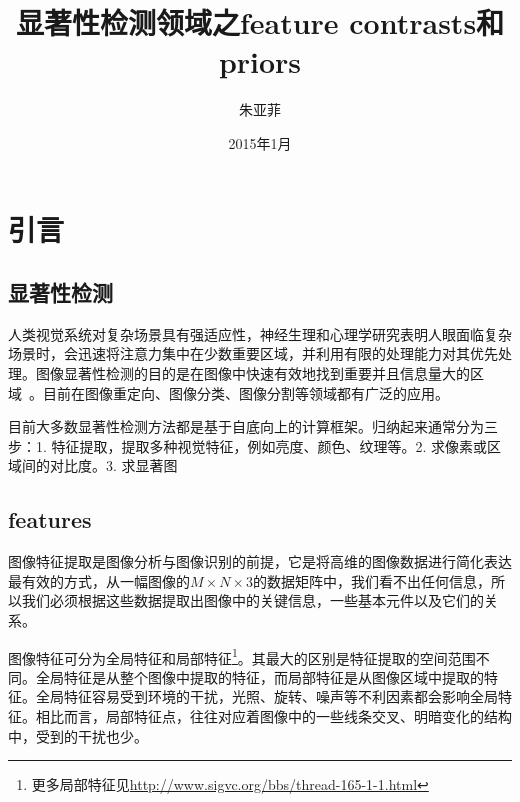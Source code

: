 \documentclass[12pt]{article}
\begin{document}
\title{\vspace{-2em}显著性检测领域之feature contrasts和priors\vspace{-0.7em}}
\author{朱亚菲}
\date{\vspace{-0.7em}2015年1月\vspace{-0.7em}}
\maketitle\thispagestyle{fancy}
\maketitle
\tableofcontents 


\section{引言}

\subsection{显著性检测}

人类视觉系统对复杂场景具有强适应性，神经生理和心理学研究表明人眼面临复杂场景时，会迅速将注意力集中在少数重要区域，并利用有限的处理能力对其优先处理。图像显著性检测的目的是在图像中快速有效地找到重要并且信息量大的区域~\cite{li2013contextual}。目前在图像重定向、图像分类、图像分割等领域都有广泛的应用。

目前大多数显著性检测方法都是基于自底向上的计算框架。归纳起来通常分为三步：1. 特征提取，提取多种视觉特征，例如亮度、颜色、纹理等。2. 求像素或区域间的对比度。3. 求显著图

\subsection{features}

图像特征提取是图像分析与图像识别的前提，它是将高维的图像数据进行简化表达最有效的方式，从一幅图像的$M \times N \times3$的数据矩阵中，我们看不出任何信息，所以我们必须根据这些数据提取出图像中的关键信息，一些基本元件以及它们的关系。

图像特征可分为全局特征和局部特征\footnote{更多局部特征见\url{http://www.sigvc.org/bbs/thread-165-1-1.html}}。其最大的区别是特征提取的空间范围不同。全局特征是从整个图像中提取的特征，而局部特征是从图像区域中提取的特征。全局特征容易受到环境的干扰，光照、旋转、噪声等不利因素都会影响全局特征。相比而言，局部特征点，往往对应着图像中的一些线条交叉、明暗变化的结构中，受到的干扰也少。
\end{document}
